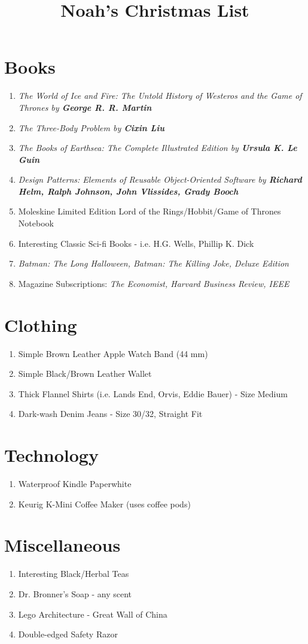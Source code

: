 \documentclass{article}
\begin{document}
\title{Noah's Christmas List}
\maketitle

\section{Books}
\begin{enumerate}
\item \it{The World of Ice and Fire: The Untold History of Westeros and the Game of Thrones} by \bf{George R. R. Martin}
\item \it{The Three-Body Problem} by \bf{Cixin Liu}
\item \it{The Books of Earthsea: The Complete Illustrated Edition} by \bf{Ursula K. Le Guin}
\item \it{Design Patterns: Elements of Reusable Object-Oriented Software} by \bf{Richard Helm, Ralph Johnson, John Vlissides, Grady Booch}
\item Moleskine Limited Edition Lord of the Rings/Hobbit/Game of Thrones Notebook
\item Interesting Classic Sci-fi Books - i.e. H.G. Wells, Phillip K. Dick
\item \it{Batman: The Long Halloween, Batman: The Killing Joke, Deluxe Edition}
\item Magazine Subscriptions: \it{The Economist, Harvard Business Review, IEEE}
\end{enumerate}
\section{Clothing}
\begin{enumerate}
	\item Simple Brown Leather Apple Watch Band (44 mm)
	\item Simple Black/Brown Leather Wallet 
	\item Thick Flannel Shirts (i.e. Lands End, Orvis, Eddie Bauer) - Size Medium
	\item Dark-wash Denim Jeans - Size 30/32, Straight Fit
\end{enumerate}
\section{Technology}
\begin{enumerate}
	\item Waterproof Kindle Paperwhite
	\item Keurig K-Mini Coffee Maker (uses coffee pods)
\end{enumerate}

\section{Miscellaneous}
\begin{enumerate}
	\item Interesting Black/Herbal Teas
	\item Dr. Bronner's Soap - any scent
	\item Lego Architecture - Great Wall of China
	\item Double-edged Safety Razor
\end{enumerate}
\end{document}
